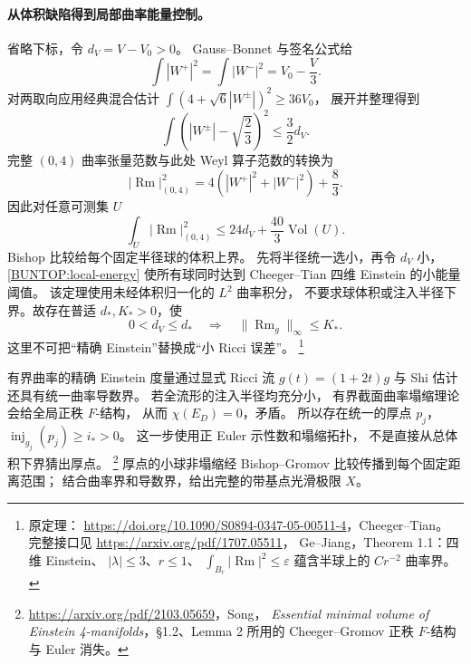 \documentclass[UTF8,fontset=fandol,zihao=-4,oneside,openany]{ctexbook}
\theoremstyle{cjkplain}
\numberwithin{equation}{chapter}
\begin{document}
\paragraph{从体积缺陷得到局部曲率能量控制。}
省略下标，令 \(d_V=V-V_0>0\)。
Gauss--Bonnet 与签名公式给
\[
 \int|W^+|^2=\int|W^-|^2=V_0-\frac V3 .
\]
对两取向应用经典混合估计
\(\int(4+\sqrt6|W^\pm|)^2\ge36V_0\)，
展开并整理得到
\begin{equation}
 \int\left(|W^\pm|-\sqrt{\frac23}\right)^2\le\frac32d_V .
 \label{BUNTOP:Weyl-length-defect}
\end{equation}
完整 \((0,4)\) 曲率张量范数与此处 Weyl 算子范数的转换为
\[
 |\operatorname{Rm}|_{(0,4)}^2
 =4(|W^+|^2+|W^-|^2)+\frac83 .
\]
因此对任意可测集 \(U\)
\begin{equation}
 \int_U|\operatorname{Rm}|_{(0,4)}^2
 \le24d_V+\frac{40}{3}\operatorname{Vol}(U).
 \label{BUNTOP:local-energy}
\end{equation}
Bishop 比较给每个固定半径球的体积上界。
先将半径统一选小，再令 \(d_V\) 小，
\eqref{BUNTOP:local-energy} 使所有球同时达到
Cheeger--Tian 四维 Einstein 的小能量阈值。
该定理使用未经体积归一化的 \(L^2\) 曲率积分，
不要求球体积或注入半径下界。故存在普适 \(d_*,K_*>0\)，使
\begin{equation}
 0<d_V\le d_*\quad\Longrightarrow\quad
 \|\operatorname{Rm}_g\|_\infty\le K_* .
 \label{BUNTOP:endpoint-curvature}
\end{equation}
这里不可把“精确 Einstein”替换成“小 Ricci 误差”。%
\footnote{原定理：
\url{https://doi.org/10.1090/S0894-0347-05-00511-4}，Cheeger--Tian。
完整接口见 \url{https://arxiv.org/pdf/1707.05511}，
Ge--Jiang，Theorem 1.1：四维 Einstein、
\(|\lambda|\le3\)、\(r\le1\)、
\(\int_{B_r}|\operatorname{Rm}|^2\le\varepsilon\)
蕴含半球上的 \(Cr^{-2}\) 曲率界。}

有界曲率的精确 Einstein 度量通过显式 Ricci 流
\(g(t)=(1+2t)g\) 与 Shi 估计还具有统一曲率导数界。
若全流形的注入半径均充分小，
有界截面曲率塌缩理论会给全局正秩 \(F\)-结构，
从而 \(\chi(E_D)=0\)，矛盾。
所以存在统一的厚点 \(p_j\)，
\(\operatorname{inj}_{g_j}(p_j)\ge i_*>0\)。
这一步使用正 Euler 示性数和塌缩拓扑，
不是直接从总体积下界猜出厚点。%
\footnote{\url{https://arxiv.org/pdf/2103.05659}，Song，
\emph{Essential minimal volume of Einstein 4-manifolds}，§1.2、Lemma 2
所用的 Cheeger--Gromov 正秩 \(F\)-结构与 Euler 消失。}
厚点的小球非塌缩经 Bishop--Gromov 比较传播到每个固定距离范围；
结合曲率界和导数界，给出完整的带基点光滑极限 \(X\)。
\end{document}
